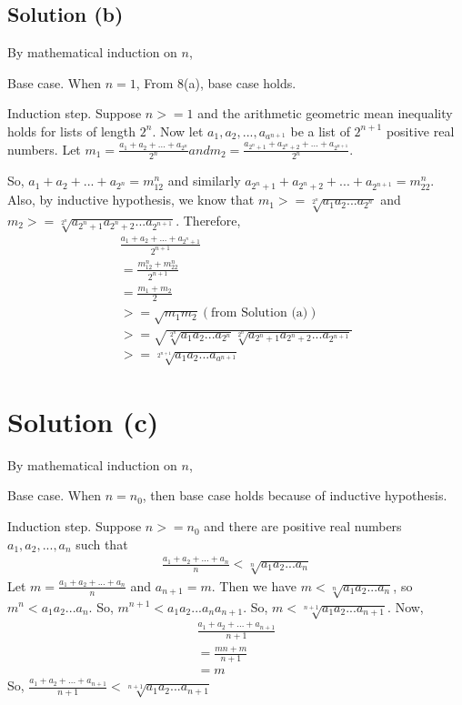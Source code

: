 \documentclass{article}
\begin{document}
\subsection{Solution (b)}
By mathematical induction on $n$,

Base case. When $n=1$, From 8(a), base case holds.

Induction step. Suppose $n>=1$ and the arithmetic geometric mean
inequality holds for lists of length $2^n$. Now let $a_1,a_2,...,
a_{a^{n+1}}$ be a list of $2^{n+1}$ positive real numbers. Let
$m_1 = \frac{a_1 + a_2 + ... + a_{2^n}}{2^n} and m_2 = \frac{a_{2^n +
    1} + a_{2^n + 2} + ... + a_{2^{n+1}}}{2^n}$.

So, $a_1 + a_2 + ... + a_{2^n} = m_12^n$ and similarly $a_{2^n + 1} +
a_{2^n + 2} + ... + a_{2^{n+1}} = m_22^n$. Also, by inductive
hypothesis, we know that $m_1 >= \sqrt[2^n]{a_1a_2...a_{2^n}}$ and
$m_2 >= \sqrt[2^n]{a_{2^n + 1}a_{2^n + 2}...a_{2^{n+1}} }$. Therefore,
\begin{align*}
  \frac{a_1 + a_2 + ... + a_{2^n + 1}}{2^{n+1}} \\
  = \frac{m_12^n + m_22^n}{2^{n+1}} \\
  = \frac{m_1 + m_2}{2} \\
  >= \sqrt{m_1m_2}   (\text{from Solution (a)}) \\
  >= \sqrt{\sqrt[2^n]{a_1a_2...a_{2^n}}\sqrt[2^n]{a_{2^n + 1}a_{2^n+2}...a_{2^{n+1}}}} \\
  >= \sqrt[2^{n+1}]{a_1a_2...a_{a^{n+1}}}
\end{align*}

\section{Solution (c)}
By mathematical induction on $n$,

Base case. When $n=n_0$, then base case holds because of inductive
hypothesis.

Induction step. Suppose $n >= n_0$ and there are positive real numbers
$a_1, a_2, ..., a_n$ such that
\begin{align*}
  \frac{a_1 + a_2 + ... + a_n}{n} < \sqrt[n]{a_1a_2...a_n}
\end{align*}
Let $m = \frac{a_1 + a_2 + ... + a_n}{n}$ and $a_{n+1} = m$. Then we
have $m < \sqrt[n]{a_1a_2...a_n}$, so $m^n < a_1a_2...a_n$. So,
$m^{n+1} < a_1a_2...a_na_{n+1}$. So, $m <
\sqrt[n+1]{a_1a_2...a_{n+1}}$. Now,
\begin{align*}
  \frac{a_1 + a_2 + ... + a_{n+1}}{n+1} \\
  = \frac{mn + m}{n+1} \\
  = m
\end{align*}
So, $\frac{a_1 + a_2 + ... + a_{n+1}}{n+1} <
\sqrt[n+1]{a_1a_2...a_{n+1}}$
\end{document}

